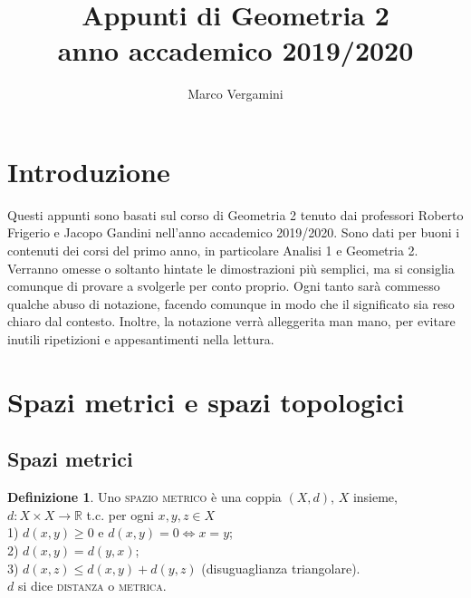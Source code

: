 \documentclass{article}
\title{Appunti di Geometria 2 \\ anno accademico 2019/2020}
\author{Marco Vergamini}
\theoremstyle{definition}
\newtheorem*{defn}{Definizione}
\begin{document}
	\maketitle
	
	\newpage
	
	\tableofcontents
	
	\newpage
	
	\section{Introduzione}
	Questi appunti sono basati sul corso di Geometria 2 tenuto dai professori Roberto Frigerio e Jacopo Gandini nell'anno accademico 2019/2020. Sono dati per buoni i contenuti dei corsi del primo anno, in particolare Analisi 1 e Geometria 2. Verranno omesse o soltanto hintate le dimostrazioni più semplici, ma si consiglia comunque di provare a svolgerle per conto proprio. Ogni tanto sarà commesso qualche abuso di notazione, facendo comunque in modo che il significato sia reso chiaro dal contesto. Inoltre, la notazione verrà alleggerita man mano, per evitare inutili ripetizioni e appesantimenti nella lettura.
	
	\section{Spazi metrici e spazi topologici}
	\subsection{Spazi metrici}
	\begin{defn}
		Uno \textsc{spazio metrico} è una coppia $(X, d)$, $X$ insieme, \\ $d: X \times X \rightarrow \mathbb{R}$ t.c. per ogni $x, y, z \in X$ \\
		1) $d(x, y) \ge 0$ e $d(x, y)=0 \Leftrightarrow x=y$; \\
		2) $d(x, y)=d(y, x)$; \\
		3) $d(x, z) \le d(x, y)+d(y,z)$ (disuguaglianza triangolare). \\
		$d$ si dice \textsc{distanza} o \textsc{metrica}.
	\end{defn}
	
\end{document}
